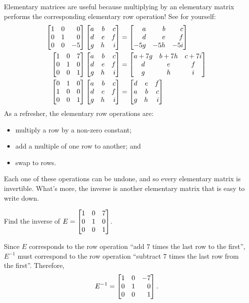Elementary matrices are useful because multiplying by an elementary matrix performs the corresponding elementary row operation! See for
yourself:
\begin{align*}
	\mat{1&0&0\\0&1&0\\0&0&-5}
	\mat{a&b&c\\d&e&f\\g&h&i}
	&=
	\mat{a&b&c\\d&e&f\\-5g&-5h&-5i}
\\
	\mat{1&0&7\\0&1&0\\0&0&1}
	\mat{a&b&c\\d&e&f\\g&h&i}
	&=
	\matc{a+7g&b+7h&c+7i\\d&e&f\\g&h&i}
\\
	\mat{0&1&0\\1&0&0\\0&0&1}
	\mat{a&b&c\\d&e&f\\g&h&i}
	&=
	\mat{d&e&f\\a&b&c\\g&h&i}
\end{align*}
As a refresher, the elementary row operations are:
\begin{itemize}
	\item multiply a row by a non-zero constant;
	\item add a multiple of one row to another; and
	\item swap to rows.
\end{itemize}
Each one of these operations can be undone, and so every elementary matrix is invertible. What's more, the inverse is
another elementary matrix that is
easy to write down.

\begin{example}
	Find the inverse of $E=
	\mat{1&0&7\\0&1&0\\0&0&1}$.

	Since $E$ corresponds to the row operation ``add $7$ times the last row to the first'', $E^{-1}$ must correspond
	to the row operation ``subtract $7$ times the last row from the first''. Therefore,
	\[
		E^{-1}=\mat{1&0&-7\\0&1&0\\0&0&1}.
	\]
\end{example}


